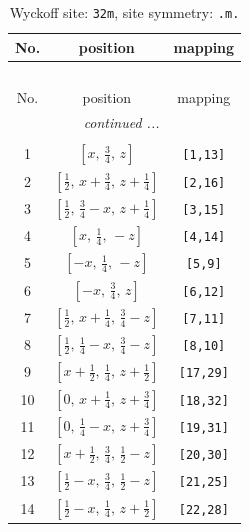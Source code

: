 \documentclass[fleqn,8pt]{jsarticle}
\begin{document}
\begin{longtable}{ccc}
\caption{Wyckoff site: {\tt 32m}, site symmetry: {\tt .m.}}
 \\
 \hline \hline
No. & position & mapping \\ \hline \endfirsthead

\multicolumn{2}{l}{\tablename\ \thetable{}} \\
 \hline \hline
No. & position & mapping \\ \hline \endhead

 \hline \hline
\multicolumn{2}{r}{\footnotesize\it continued ...} \\ \endfoot

 \hline \hline
\multicolumn{2}{r}{} \\ \endlastfoot

1 & $\left[ x,\, \frac{3}{4},\, z \right]$ & {\tt [1,13]} \\ \hline
2 & $\left[ \frac{1}{2},\, x + \frac{3}{4},\, z + \frac{1}{4} \right]$ & {\tt [2,16]} \\ \hline
3 & $\left[ \frac{1}{2},\, \frac{3}{4} - x,\, z + \frac{1}{4} \right]$ & {\tt [3,15]} \\ \hline
4 & $\left[ x,\, \frac{1}{4},\, - z \right]$ & {\tt [4,14]} \\ \hline
5 & $\left[ - x,\, \frac{1}{4},\, - z \right]$ & {\tt [5,9]} \\ \hline
6 & $\left[ - x,\, \frac{3}{4},\, z \right]$ & {\tt [6,12]} \\ \hline
7 & $\left[ \frac{1}{2},\, x + \frac{1}{4},\, \frac{3}{4} - z \right]$ & {\tt [7,11]} \\ \hline
8 & $\left[ \frac{1}{2},\, \frac{1}{4} - x,\, \frac{3}{4} - z \right]$ & {\tt [8,10]} \\ \hline
9 & $\left[ x + \frac{1}{2},\, \frac{1}{4},\, z + \frac{1}{2} \right]$ & {\tt [17,29]} \\ \hline
10 & $\left[ 0,\, x + \frac{1}{4},\, z + \frac{3}{4} \right]$ & {\tt [18,32]} \\ \hline
11 & $\left[ 0,\, \frac{1}{4} - x,\, z + \frac{3}{4} \right]$ & {\tt [19,31]} \\ \hline
12 & $\left[ x + \frac{1}{2},\, \frac{3}{4},\, \frac{1}{2} - z \right]$ & {\tt [20,30]} \\ \hline
13 & $\left[ \frac{1}{2} - x,\, \frac{3}{4},\, \frac{1}{2} - z \right]$ & {\tt [21,25]} \\ \hline
14 & $\left[ \frac{1}{2} - x,\, \frac{1}{4},\, z + \frac{1}{2} \right]$ & {\tt [22,28]} \\ \hline

\end{longtable}
\end{document}
